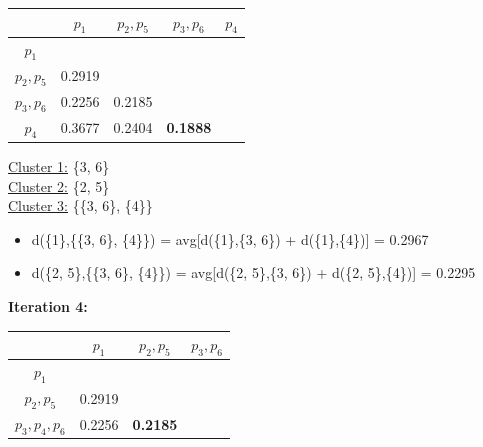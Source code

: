 \documentclass[11pt]{article}
\begin{document}
	\begin{center}
    	\begin{adjustbox}{max width=\textwidth}
		\begin{tabular}{ | c | c | c | c | c |}
	  	 	\hline

	  	 	& \textbf{$p_1$} & \textbf{$p_2, p_5$} & \textbf{$p_3, p_6$} & \textbf{$p_4$}\\
	  	 	\hline
	  	 	
	  	 	\textbf{$p_1$} &  &  &  &\\
	  	 	\hline
	  	 	
	  	 	\textbf{$p_2, p_5$} & 0.2919 &  &  &\\
	  	 	\hline
	  	 	
	  	 	\textbf{$p_3, p_6$} & 0.2256 & 0.2185 &  &\\
	  	 	\hline
	  	 	
	  	 	\textbf{$p_4$} & 0.3677 & 0.2404 & \textbf{0.1888} &\\
	  	 	\hline		
    		\end{tabular}
    	\end{adjustbox}
	\end{center}
	
	\underline{Cluster 1:} \{3, 6\} \\
	\underline{Cluster 2:} \{2, 5\} \\
	\underline{Cluster 3:} \{\{3, 6\}, \{4\}\}
	
	\begin{itemize}
		\item d(\{1\},\{\{3, 6\}, \{4\}\}) = avg[d(\{1\},\{3, 6\}) + d(\{1\},\{4\})] = 0.2967
		\item d(\{2, 5\},\{\{3, 6\}, \{4\}\}) = avg[d(\{2, 5\},\{3, 6\}) + d(\{2, 5\},\{4\})] = 0.2295
	\end{itemize}
	
	\vspace{5mm}
	
	\textbf{Iteration 4:}
	
	\begin{center}
    	\begin{adjustbox}{max width=\textwidth}
		\begin{tabular}{ | c | c | c | c |}
	  	 	\hline

	  	 	& \textbf{$p_1$} & \textbf{$p_2, p_5$} & \textbf{$p_3, p_6$}\\
	  	 	\hline
	  	 	
	  	 	\textbf{$p_1$} &  &  &\\
	  	 	\hline
	  	 	
	  	 	\textbf{$p_2, p_5$} & 0.2919 &  &\\
	  	 	\hline
	  	 	
	  	 	\textbf{$p_3, p_4, p_6$} & 0.2256 & \textbf{0.2185} &\\
	  	 	\hline	
    		\end{tabular}
    	\end{adjustbox}
	\end{center}
	
\end{document}
